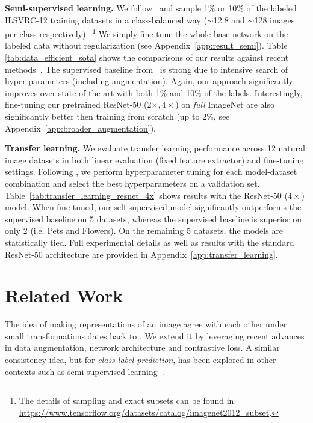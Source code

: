 \textbf{Semi-supervised learning.} We follow~\citet{zhai2019s4l} and sample 1\% or 10\% of the labeled ILSVRC-12 training datasets in a class-balanced way ($\sim$12.8 and $\sim$128 images per class respectively).~\footnote{The details of sampling and exact subsets can be found in \href{https://www.tensorflow.org/datasets/catalog/imagenet2012\_subset}{https://www.tensorflow.org/datasets/catalog/imagenet2012\_subset}.} We simply fine-tune the whole base network on the labeled data without regularization (see Appendix~\ref{app:result_semi}). Table \ref{tab:data_efficient_sota} shows the comparisons of our results against recent methods~\cite{zhai2019s4l,xie2019unsupervised,sohn2020fixmatch,wu2018unsupervised,donahue2019large,misra2019self,henaff2019data}. The supervised baseline from~\cite{zhai2019s4l} is strong due to intensive search of hyper-parameters (including augmentation). Again, our approach significantly improves over state-of-the-art with both 1\% and 10\% of the labels. Interestingly, fine-tuning our pretrained ResNet-50 (2$\times, 4\times$) on \textit{full} ImageNet are also significantly better then training from scratch (up to 2\%, see Appendix~\ref{app:broader_augmentation}).

\textbf{Transfer learning.} We evaluate transfer learning performance across 12 natural image datasets in both linear evaluation (fixed feature extractor) and fine-tuning settings. Following \citet{kornblith2019better}, we perform hyperparameter tuning for each model-dataset combination and select the best hyperparameters on a validation set. Table~\ref{tab:transfer_learning_resnet_4x} shows results with the ResNet-50 ($4\times$) model.  When fine-tuned, our self-supervised model significantly outperforms the supervised baseline on 5 datasets, whereas the supervised baseline is superior on only 2 (i.e. Pets and Flowers). On the remaining 5 datasets, the models are statistically tied. Full experimental details as well as results with the standard ResNet-50 architecture are provided in Appendix~\ref{app:transfer_learning}. \section{Related Work}
\label{sec:related}

The idea of making representations of an image agree with each other under small transformations dates back to \citet{becker1992self}. We extend it by leveraging recent advances in data augmentation, network architecture and contrastive loss. A similar consistency idea, but for \textit{class label prediction}, has been explored in other contexts such as semi-supervised learning~\cite{xie2019unsupervised,berthelot2019mixmatch}.

